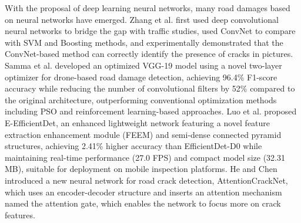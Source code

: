 \documentclass[sensors,article,submit,moreauthors]{Definitions/mdpi}
\begin{document}
    With the proposal of deep learning neural networks, many road damages based on neural networks have emerged. Zhang et al. first used deep convolutional neural networks to bridge the gap with traffic studies, used ConvNet to compare with SVM and Boosting methods, and experimentally demonstrated that the ConvNet-based method can correctly identify the presence of cracks in pictures.
    Samma et al.\citep{samma2021evolving} developed an optimized VGG-19 model using a novel two-layer optimizer for drone-based road damage detection, achieving 96.4\% F1-score accuracy while reducing the number of convolutional filters by 52\% compared to the original architecture, outperforming conventional optimization methods including PSO and reinforcement learning-based approaches. Luo et al.\citep{luo2023enhanced} proposed E-EfficientDet, an enhanced lightweight network featuring a novel feature extraction enhancement module (FEEM) and semi-dense connected pyramid structures, achieving 2.41\% higher accuracy than EfficientDet-D0 while maintaining real-time performance (27.0 FPS) and compact model size (32.31 MB), suitable for deployment on mobile inspection platforms. He and Chen\citep{chen2022novel} introduced a new neural network for road crack detection, AttentionCrackNet, which uses an encoder-decoder structure and inserts an attention mechanism named the attention gate, which enables the network to focus more on crack features.
\end{document}
